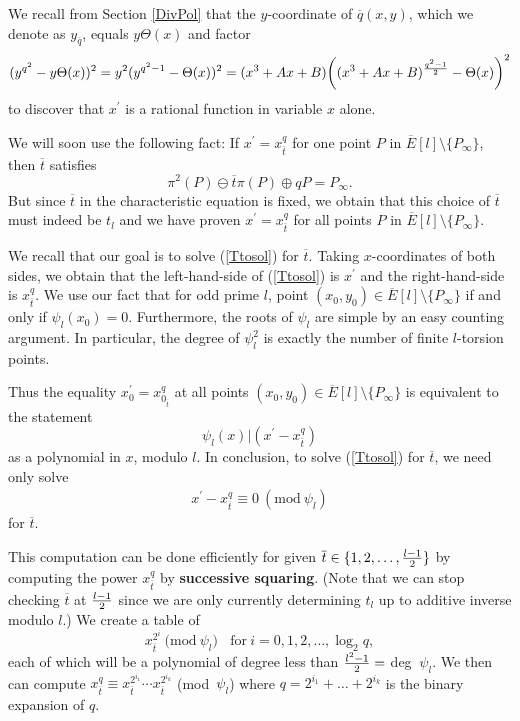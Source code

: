 \documentclass{article}
\begin{document}
We recall from Section \ref{DivPol} that the $y$-coordinate of
$\overline{q}(x,y)$, which we denote as $y_{\overline{q}}$, equals
$y\Theta(x)$ and factor
$$(y^{q^2}-y\Theta(x))^2 = y^2(y^{q^2-1}-\Theta(x))^2 =
(x^3+Ax+B)\bigg((x^3+Ax+B)^{q^2-1 \over 2}-\Theta(x)\bigg)^2$$ to
discover that $x^\prime$ is a rational function in variable $x$
alone.

We will soon use the following fact: If $x^\prime = x_{\overline{t}}^q$ for one point $P$ in
$\overline{E}[l]\setminus \{P_\infty\}$, then $\overline{t}$
satisfies
$$\pi^2(P) \ominus \overline{t}\pi(P) \oplus qP = P_\infty.$$ But
since $\overline{t}$ in the characteristic equation is fixed, we
obtain that this choice of $\overline{t}$ must indeed be $t_l$ and
we have proven $x^\prime = x_{\overline{t}}^q$ for all points $P$ in
$\overline{E}[l]\setminus \{P_\infty\}$.

We recall that our goal is to solve (\ref{Ttosol}) for
$\overline{t}$.  Taking $x$-coordinates of both sides, we obtain
that the left-hand-side of (\ref{Ttosol}) is $x^\prime$ and the
right-hand-side is $x_{\overline{t}}^q$.  We use our fact that for
odd prime $l$, point $(x_0,y_0) \in \overline{E}[l]\setminus
\{P_\infty\}$ if and only if $\psi_l(x_0)=0$.  Furthermore, the
roots of $\psi_l$ are simple by an easy counting argument.  In
particular, the degree of $\psi_l^2$ is exactly the number of finite
$l$-torsion points.  

Thus the equality $x_0^\prime =
x_{0_{\overline{t}}}^q$ at all points $(x_0,y_0) \in
\overline{E}[l]\setminus \{P_\infty\}$ is equivalent to the
statement $$\psi_l(x) \bigg | (x^\prime - x_{\overline{t}}^q)$$ as a 
polynomial in $x$, modulo $l$.  In conclusion, to solve (\ref{Ttosol}) for $\overline{t}$, we need only solve
\begin{eqnarray} \label{Eqtosol} x^\prime - x^q_{\overline{t}} \equiv 0 ~(\mathrm{mod~}\psi_l)\end{eqnarray} for
$\overline{t}$.

This computation can be done efficiently for given $\overline{t} \in
\{1,2,\dots,{l-1\over 2}\}$ by computing the power $x_{\overline{t}}^q$ by
{\bf successive squaring}.  (Note that we can stop checking $\overline{t}$ at ${l-1 \over 2}$ since we are only currently determining $t_l$ up 
to additive inverse modulo $l$.)  We create a table of
$$x_{\overline{t}}^{2^i} \mathrm{~(mod}~\psi_l) \mathrm{~~~~for~}i=0,1,2,\dots, \log_2 q,$$ each of
which will be a polynomial of degree less than ${l^2-1\over 2} = $ deg $~\psi_l$.  We then can
compute $x_{\overline{t}}^{q} \equiv x_{\overline{t}}^{2^{i_1}}\cdots x_{\overline{t}}^{2^{i_k}}$
(mod~$\psi_l$) where $q=2^{i_1}+\dots+2^{i_k}$ is the binary expansion of $q$.
\end{document}
